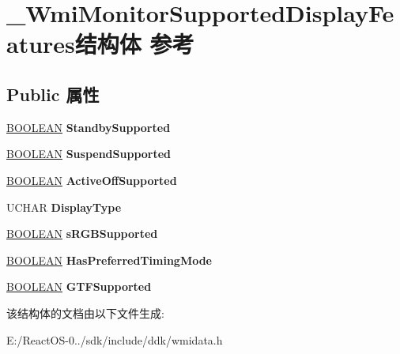 \hypertarget{struct___wmi_monitor_supported_display_features}{}\section{\+\_\+\+Wmi\+Monitor\+Supported\+Display\+Features结构体 参考}
\label{struct___wmi_monitor_supported_display_features}
\subsection*{Public 属性}
\begin{DoxyCompactItemize}
\item 
\mbox{\label{struct___wmi_monitor_supported_display_features_a5172726c03cc10b4c1230354af8d042e}} 
\hyperlink{_processor_bind_8h_a112e3146cb38b6ee95e64d85842e380a}{B\+O\+O\+L\+E\+AN} {\bfseries Standby\+Supported}
\item 
\mbox{\label{struct___wmi_monitor_supported_display_features_ac86bca0797c20f048164ce13a8a14228}} 
\hyperlink{_processor_bind_8h_a112e3146cb38b6ee95e64d85842e380a}{B\+O\+O\+L\+E\+AN} {\bfseries Suspend\+Supported}
\item 
\mbox{\label{struct___wmi_monitor_supported_display_features_a5e7cb593bdd53f0266fb791d19809477}} 
\hyperlink{_processor_bind_8h_a112e3146cb38b6ee95e64d85842e380a}{B\+O\+O\+L\+E\+AN} {\bfseries Active\+Off\+Supported}
\item 
\mbox{\label{struct___wmi_monitor_supported_display_features_a80868f7ef28e5eebebe85cd03d1365c9}} 
U\+C\+H\+AR {\bfseries Display\+Type}
\item 
\mbox{\label{struct___wmi_monitor_supported_display_features_a42ad1555b7efcb34e999641f9811729f}} 
\hyperlink{_processor_bind_8h_a112e3146cb38b6ee95e64d85842e380a}{B\+O\+O\+L\+E\+AN} {\bfseries s\+R\+G\+B\+Supported}
\item 
\mbox{\label{struct___wmi_monitor_supported_display_features_ad4d4aa6d56065d81d7f4bdbe9e2607d2}} 
\hyperlink{_processor_bind_8h_a112e3146cb38b6ee95e64d85842e380a}{B\+O\+O\+L\+E\+AN} {\bfseries Has\+Preferred\+Timing\+Mode}
\item 
\mbox{\label{struct___wmi_monitor_supported_display_features_a70d7d7d5eadb75a91dd33777069870b6}} 
\hyperlink{_processor_bind_8h_a112e3146cb38b6ee95e64d85842e380a}{B\+O\+O\+L\+E\+AN} {\bfseries G\+T\+F\+Supported}
\end{DoxyCompactItemize}


该结构体的文档由以下文件生成\+:\begin{DoxyCompactItemize}
\item 
E\+:/\+React\+O\+S-\/0../sdk/include/ddk/wmidata.\+h\end{DoxyCompactItemize}
